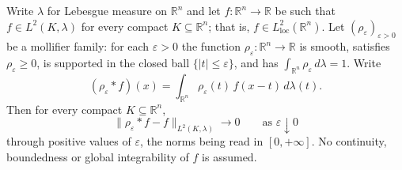 \begin{lemma}
Write $\lambda$ for Lebesgue measure on $\mathbb{R}^n$ and let
$f : \mathbb{R}^n \to \mathbb{R}$ be such that $f \in L^2(K,\lambda)$ for every
compact $K \subseteq \mathbb{R}^n$; that is, $f \in L^2_{\mathrm{loc}}(\mathbb{R}^n)$.
Let $(\rho_\varepsilon)_{\varepsilon>0}$ be a mollifier family: for each
$\varepsilon > 0$ the function $\rho_\varepsilon : \mathbb{R}^n \to \mathbb{R}$ is
smooth, satisfies $\rho_\varepsilon \geq 0$, is supported in the closed ball
$\{|t| \leq \varepsilon\}$, and has $\int_{\mathbb{R}^n}\rho_\varepsilon\,d\lambda = 1$.
Write
\[
  (\rho_\varepsilon * f)(x) = \int_{\mathbb{R}^n} \rho_\varepsilon(t)\, f(x-t)\, d\lambda(t) .
\]
Then for every compact $K \subseteq \mathbb{R}^n$,
\[
  \bigl\|\rho_\varepsilon * f - f\bigr\|_{L^2(K,\lambda)} \longrightarrow 0
  \qquad\text{as } \varepsilon \downarrow 0
\]
through positive values of $\varepsilon$, the norms being read in $[0,+\infty]$.
No continuity, boundedness or global integrability of $f$ is assumed.
\end{lemma}
